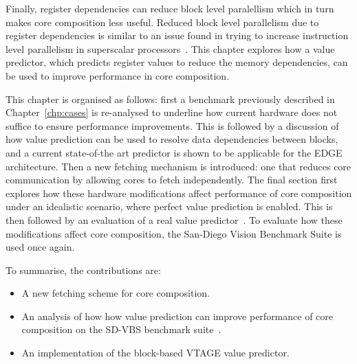 
Finally, register dependencies can reduce block level paralellism which in turn makes core composition less useful.
Reduced block level parallelism due to register dependencies is similar to an issue found in trying to increase instruction level parallelism in superscalar processors~\cite{peraisBeBop2015}.
This chapter explores how a value predictor, which predicts register values to reduce the memory dependencies, can be used to improve performance in core composition.

This chapter is organised as follows: first a benchmark previously described in Chapter~\ref{chp:cases} is re-analysed to underline how current hardware does not suffice to ensure performance improvements.
This is followed by a discussion of how value prediction can be used to resolve data dependencies between blocks, and a current state-of-the art predictor is shown to be applicable for the EDGE architecture.
Then a new fetching mechanism is introduced: one that reduces core communication by allowing cores to fetch independently.
The final section first explores how these hardware modifications affect performance of core composition under an idealistic scenario, where perfect value prediction is enabled.
This is then followed by an evaluation of a real value predictor~\cite{peraisBeBop2015}.
To evaluate how these modifications affect core composition, the San-Diego Vision Benchmark Suite is used once again.

To summarise, the contributions are:

\begin{itemize}
\item A new fetching scheme for core composition.
\item An analysis of how how value prediction can improve performance of core composition on the SD-VBS benchmark suite~\cite{sdvbs}.
\item An implementation of the block-based VTAGE value predictor.
\end{itemize}